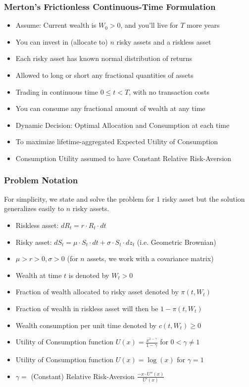 \documentclass[handout]{beamer}
\begin{document}
\begin{frame}
\frametitle{Merton's Frictionless Continuous-Time Formulation}
\pause
\begin{itemize}[<+->]
\item Assume: Current wealth is $W_0 > 0$, and you'll live for $T$ more years
\item You can invest in (allocate to) $n$ risky assets and a riskless asset
\item Each risky asset has known normal distribution of returns
\item Allowed to long or short any fractional quantities of assets
\item Trading in continuous time $0 \leq t < T$, with no transaction costs
\item You can consume any fractional amount of wealth at any time
\item Dynamic Decision: Optimal Allocation and Consumption at each time
\item To maximize lifetime-aggregated Expected Utility of Consumption
\item Consumption Utility assumed to have Constant Relative Risk-Aversion
\end{itemize}
\end{frame}

\begin{frame}
\frametitle{Problem Notation}
For simplicity, we state and solve the problem for 1 risky asset but the solution generalizes easily to $n$ risky assets.
\pause
\begin{itemize}[<+->]
\item Riskless asset: $dR_t = r \cdot R_t \cdot dt$
\item Risky asset: $dS_t = \mu \cdot S_t \cdot dt + \sigma \cdot S_t \cdot dz_t$ (i.e. Geometric Brownian)
\item $\mu > r > 0, \sigma > 0$ (for $n$ assets, we work with a covariance matrix)
\item Wealth at time $t$ is denoted by $W_t > 0$
\item Fraction of wealth allocated to risky asset denoted by $\pi(t, W_t)$
\item Fraction of wealth in riskless asset will then be $1 - \pi(t, W_t)$
\item Wealth consumption per unit time denoted by $c(t, W_t) \geq 0$
\item Utility of Consumption function $U(x) = \frac {x^{1-\gamma}} {1 - \gamma}$ for $0 < \gamma \neq 1$
\item Utility of Consumption function $U(x) = \log(x)$ for $\gamma = 1$
\item $\gamma =$ (Constant) Relative Risk-Aversion $\frac {-x \cdot U''(x)} {U'(x)}$
\end{itemize}
\end{frame}
\end{document}
